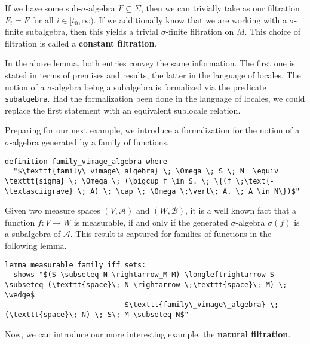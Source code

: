 If we have some sub-$\sigma$-algebra $F \subseteq \Sigma$, then we can trivially take as our filtration $F_i = F$ for all $i \in [t_0,\infty)$. If we additionally know that we are working with a $\sigma$-finite subalgebra, then this yields a trivial $\sigma$-finite filtration on $M$. This choice of filtration is called a \textbf{constant filtration}. 

\begin{remark}
	In the above lemma, both entries convey the same information. The first one is stated in terms of premises and results, the latter in the language of locales. The notion of a $\sigma$-algebra being a subalgebra is formalized via the predicate \texttt{subalgebra}. Had the formalization been done in the language of locales, we could replace the first statement with an equivalent sublocale relation.
\end{remark}

Preparing for our next example, we introduce a formalization for the notion of a $\sigma$-algebra generated by a family of functions.

\begin{isadefinition}
{\small
\begin{lstlisting}[style=isabelle]
definition family_vimage_algebra where
  "$\texttt{family\_vimage\_algebra} \; \Omega \; S \; N  \equiv \texttt{sigma} \; \Omega \; (\bigcup f \in S. \; \{(f \;\text{-\textasciigrave} \; A) \; \cap \; \Omega \;\vert\; A. \; A \in N\})$"
\end{lstlisting}
}
\end{isadefinition}

Given two measure spaces $(V, \mathcal{A})$ and $(W, \mathcal{B})$, it is a well known fact that a function $f : V \rightarrow W$ is measurable, if and only if the generated $\sigma$-algebra $\sigma(f)$ is a subalgebra of $\mathcal{A}$. This result is captured for families of functions in the following lemma.

\begin{isalemma}
{\small
\begin{lstlisting}[style=isabelle]
lemma measurable_family_iff_sets:
  shows "$(S \subseteq N \rightarrow_M M) \longleftrightarrow S \subseteq (\texttt{space}\; N \rightarrow \;\texttt{space}\; M) \; \wedge$
                            $\texttt{family\_vimage\_algebra} \; (\texttt{space}\; N) \; S\; M \subseteq N$"
\end{lstlisting}
}
\end{isalemma}

Now, we can introduce our more interesting example, the \textbf{natural filtration}.

